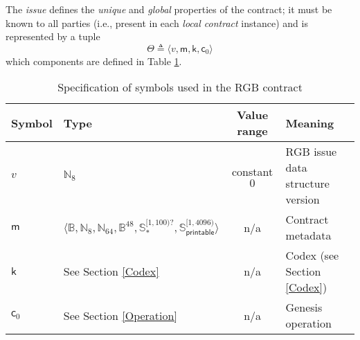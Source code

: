 \documentclass[9pt,oneside]{amsart}
\begin{document}
\begin{multicols}{2}
The \emph{issue} defines the \emph{unique} and \emph{global} properties of the contract;
it must be known to all parties (i.e., present in each \emph{local contract} instance) and
is represented by a tuple
\noindent
\begin{equation}\label{eq:issue}
\mathsf{\Theta} \triangleq \langle v, \mathsf{m}, \mathsf{k}, \mathsf{c}_0 \rangle
\end{equation}
\noindent
which components are defined in Table \ref{tab:contract}.

\end{multicols}
\begin{table}[h]
\centering
\caption{Specification of symbols used in the RGB contract}\label{tab:contract}
\begin{tabular}{ l l c l }
\toprule
Symbol & Type & Value range & Meaning \\
\midrule
$v$ & $\mathbb{N}_8$ & constant $0$ & RGB issue data structure version \\
$\mathsf{m}$   & $\langle \mathbb{B}, \mathbb{N}_8, \mathbb{N}_{64}, \mathbb{B}^{48}, \mathbb{S}_*^{[1, 100)?}, \mathbb{S}_\mathsf{printable}^{[1, 4096)} \rangle$ & n/a & Contract metadata \\
$\mathsf{k}$   & See Section \ref{Codex} & n/a & Codex (see Section \ref{Codex}) \\
$\mathsf{c}_0$ & See Section \ref{Operation} & n/a & Genesis operation \\
\bottomrule
\end{tabular}
\end{table}
\end{document}
